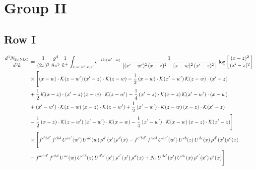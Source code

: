 \documentclass[9pt]{article}
\numberwithin{equation}{section}
\begin{document}
\section{Group II}
\subsection{Row I}
\begin{align}
\frac{d^{3}N_{2a\,\rm NLO}}{d^{3}k}&=\frac{1}{(2\pi)^{3}}\,\frac{g^{4}}{8\pi^{5}}\,\frac{1}{k^{+}}\int_{z,w,w^{\prime},x,x^{\prime}}e^{-ik\cdot(w^{\prime}-w)}\,\frac{1}{\big[(x^{\prime}-w^{\prime})^{2}\,(x-z)^{2}-(x-w)^{2}\,(x^{\prime}-z)^{2}\big]}\,\log\left[\frac{(x-z)^{2}}{(x^{\prime}-z)^{2}}\right]\notag\\
&\times\Bigg[(x-w)\cdot\mathcal{K}(z-w^{\prime})\,(x^{\prime}-z)\cdot\mathcal{K}(z-w)-\frac{1}{2}\,(x-w)\cdot\mathcal{K}(x^{\prime}-w^{\prime})\,\mathcal{K}(z-w)\cdot(x^{\prime}-z)\notag \\ & +\frac{1}{2}\,\mathcal{K}(x-z)\cdot(x^{\prime}-z)\,(x-w)\cdot\mathcal{K}(z-w^{\prime}) -\frac{1}{4}\,(x^{\prime}-z)\cdot\mathcal{K}(x-z)\,\mathcal{K}(x^{\prime}-w^{\prime})\cdot(x-w)\notag \\ & +(x^{\prime}-w^{\prime})\cdot\mathcal{K}(z-w)\,(x-z)\cdot\mathcal{K}(z-w^{\prime})+\frac{1}{2}\,(x^{\prime}-w^{\prime})\cdot\mathcal{K}(z-w)\,(x-z)\cdot\mathcal{K}(x^{\prime}-z)\notag \\ & -\frac{1}{2}\,(x-z)\cdot\mathcal{K}(z-w^{\prime})\,(x^{\prime}-w^{\prime})\cdot\mathcal{K}(x-w)-\frac{1}{4}\,(x^{\prime}-w^{\prime})\cdot\mathcal{K}(x-w)\,(x-z)\cdot\mathcal{K}(x^{\prime}-z)\Bigg]\notag \\ & \times\Bigg[f^{c^{\prime}bd^{\prime}}\,f^{cbd}\, U^{ac^{\prime}}(w^{\prime})\,U^{ac}(w)\,\rho^{d^{\prime}}(x^{\prime})\rho^{d}(x)- f^{c^{\prime}bd^{\prime}}\,f^{acd}\,U^{ac^{\prime}}(w^{\prime})\,U^{cb}(z)\,U^{de}(x)\,\rho^{d^{\prime}}(x^{\prime})\rho^{e}(x) \notag \\ & -f^{ac^{\prime}d^{\prime}}\,f^{cbd}\,U^{ac}(w)\,U^{c^{\prime}b}(z)\,U^{d^{\prime}e^{\prime}}(x^{\prime})\,\rho^{e^{\prime}}(x^{\prime})\,\rho^{d}(x) +N_{c}\,U^{de^{\prime}}(x^{\prime})\,U^{de}(x)\,\rho^{e^{\prime}}(x^{\prime})\,\rho^{e}(x)\Bigg]
\end{align}
\end{document}

